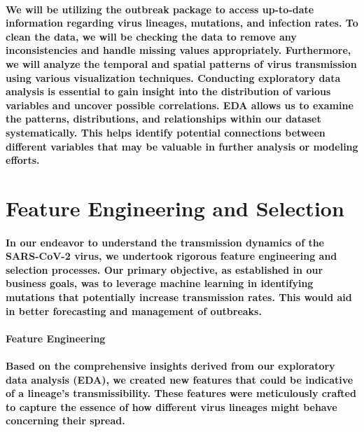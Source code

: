 \documentclass{article}
\begin{document}
\paragraph{We will be utilizing the outbreak package to access up-to-date information regarding virus lineages, mutations, and infection rates. To clean the data, we will be checking the data to remove any inconsistencies and handle missing values appropriately. Furthermore, we will analyze the temporal and spatial patterns of virus transmission using various visualization techniques. Conducting exploratory data analysis is essential to gain insight into the distribution of various variables and uncover possible correlations. EDA allows us to examine the patterns, distributions, and relationships within our dataset systematically. This helps identify potential connections between different variables that may be valuable in further analysis or modeling efforts.}
\section{\textbf{Feature Engineering and Selection}}
\paragraph{In our endeavor to understand the transmission dynamics of the SARS-CoV-2 virus, we undertook rigorous feature engineering and selection processes. Our primary objective, as established in our business goals, was to leverage machine learning in identifying mutations that potentially increase transmission rates. This would aid in better forecasting and management of outbreaks.}
\paragraph{\textbf{}}
\paragraph{\textbf{Feature Engineering}}
\paragraph{ Based on the comprehensive insights derived from our exploratory data analysis (EDA), we created new features that could be indicative of a lineage's transmissibility. These features were meticulously crafted to capture the essence of how different virus lineages might behave concerning their spread.}
\paragraph{\textbf{}}
\end{document}
